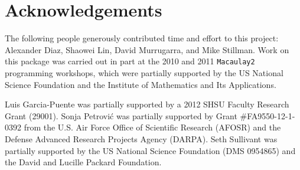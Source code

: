 \documentclass[letterpaper]{article}
\theoremstyle{definition}
\begin{document}
\section*{Acknowledgements}  
The following people generously contributed time and effort to this
project:  Alexander Diaz, Shaowei Lin, David Murrugarra, and Mike Stillman.
Work on this package was carried out in part at the 2010 and 2011
{\tt Macaulay2} programming workshops, which were partially supported 
by the US National Science Foundation and the Institute of Mathematics and 
Its Applications.

Luis Garcia-Puente was partially supported by a 2012 SHSU Faculty Research Grant (29001).
Sonja Petrovi\'c was partially supported by Grant \#FA9550-12-1-0392 from the U.S. Air Force Office of Scientific Research (AFOSR) and the Defense Advanced Research Projects Agency (DARPA).
Seth Sullivant was partially supported by the US National Science Foundation (DMS 0954865) and the David and Lucille Packard Foundation.
\end{document}

